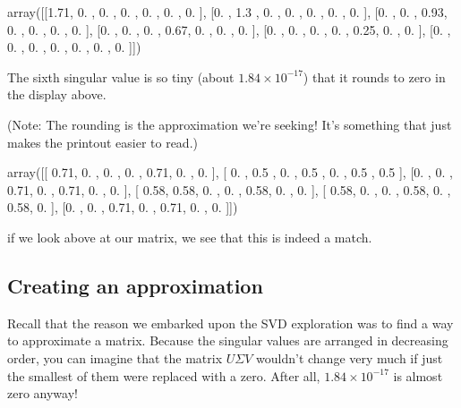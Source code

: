 \documentclass[letterpaper,10pt,english]{sphinxmanual}
\begin{document}
\begin{sphinxVerbatim}[commandchars=\\\{\}]
array([[1.71, 0.  , 0.  , 0.  , 0.  , 0.  , 0.  ],
       [0.  , 1.3 , 0.  , 0.  , 0.  , 0.  , 0.  ],
       [0.  , 0.  , 0.93, 0.  , 0.  , 0.  , 0.  ],
       [0.  , 0.  , 0.  , 0.67, 0.  , 0.  , 0.  ],
       [0.  , 0.  , 0.  , 0.  , 0.25, 0.  , 0.  ],
       [0.  , 0.  , 0.  , 0.  , 0.  , 0.  , 0.  ]])
\end{sphinxVerbatim}

The sixth singular value is so tiny (about \(1.84\times10^{-17}\)) that it rounds to zero in the display above.

(Note: The rounding is  the approximation we’re seeking!  It’s something that just makes the printout easier to read.)

\begin{sphinxVerbatim}[commandchars=\\\{\}]
       
\end{sphinxVerbatim}

\begin{sphinxVerbatim}[commandchars=\\\{\}]
array([[ 0.71, \PYGZhy{}0.  ,  0.  , \PYGZhy{}0.  ,  0.71, \PYGZhy{}0.  , \PYGZhy{}0.  ],
       [ 0.  ,  0.5 , \PYGZhy{}0.  ,  0.5 , \PYGZhy{}0.  ,  0.5 ,  0.5 ],
       [\PYGZhy{}0.  , \PYGZhy{}0.  ,  0.71, \PYGZhy{}0.  ,  0.71, \PYGZhy{}0.  , \PYGZhy{}0.  ],
       [ 0.58,  0.58,  0.  ,  0.  ,  0.58,  0.  ,  0.  ],
       [ 0.58,  0.  , \PYGZhy{}0.  ,  0.58, \PYGZhy{}0.  ,  0.58,  0.  ],
       [\PYGZhy{}0.  , \PYGZhy{}0.  ,  0.71, \PYGZhy{}0.  ,  0.71, \PYGZhy{}0.  , \PYGZhy{}0.  ]])
\end{sphinxVerbatim}

if we look above at our  matrix, we see that this is indeed a match.


\subsection{Creating an approximation}
\label{\detokenize{chapter-16-matrices:creating-an-approximation}}
Recall that the reason we embarked upon the SVD exploration was to find a way to approximate a matrix.  Because the singular values are arranged in decreasing order, you can imagine that the matrix \(U\Sigma V\) wouldn’t change very much if just the smallest of them were replaced with a zero.  After all, \(1.84\times10^{-17}\) is almost zero anyway!
\end{document}
